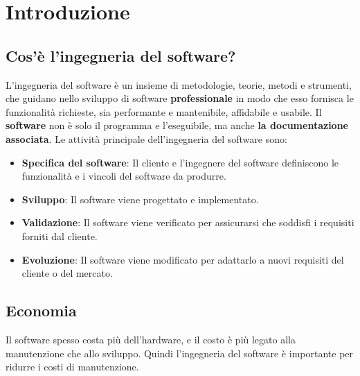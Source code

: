 \documentclass[a4paper]{article}
\begin{document}


\tableofcontents
\pagebreak

\section{Introduzione}
\subsection{Cos'è l'ingegneria del software?}
L'ingegneria del software è un insieme di metodologie, teorie, metodi e strumenti, che
guidano nello sviluppo di software \textbf{professionale} in modo che esso fornisca
le funzionalità richieste, sia performante e mantenibile, affidabile e usabile. Il
\textbf{software} non è solo il programma e l'eseguibile, ma anche \textbf{la 
documentazione associata}. Le attività principale dell'ingegneria del software sono:
\begin{itemize}
  \item \textbf{Specifica del software}: Il cliente e l'ingegnere del software definiscono
  le funzionalità e i vincoli del software da produrre.
  \item \textbf{Sviluppo}: Il software viene progettato e implementato.
  \item \textbf{Validazione}: Il software viene verificato per
    assicurarsi che soddisfi i requisiti forniti dal cliente.
  \item \textbf{Evoluzione}: Il software viene modificato per adattarlo a nuovi
    requisiti del cliente o del mercato. 
\end{itemize}

\subsection{Economia}
Il software spesso costa più dell'hardware, e il costo è più legato alla manutenzione che
allo sviluppo. Quindi l'ingegneria del software è importante per ridurre i costi di
manutenzione.
\end{document}
